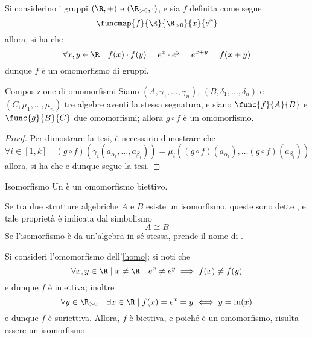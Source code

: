 \documentclass[a4paper, 12pt]{report}
\begin{document}
    \begin{example}[Omomorfismi]
        \label{homo}
        Si considerino i gruppi $(\R, +)$ e $(\R_{> 0}, \cdot)$, e sia $f$ definita come segue: $$\funcmap{f}{\R}{\R_{> 0}}{x}{e^x}$$ allora, si ha che $$\forall x, y \in \R \quad f(x) \cdot f(y) = e^x \cdot e^y = e^{x + y} = f(x + y)$$ dunque $f$ è un omomorfismo di gruppi.
    \end{example}

    \begin{framedprop}[label={comp homo}]{Composizione di omomorfismi}
        Siano $(A, \gamma_1, \ldots, \gamma_n)$, $(B, \delta_1, \ldots, \delta_n)$ e $(C, \mu_1, \ldots, \mu_n)$ tre algebre aventi la stessa segnatura, e siano $\func{f}{A}{B}$ e $\func{g}{B}{C}$ due omomorfismi; allora $g \circ f$ è un omomorfismo.
    \end{framedprop}

    \begin{proof}
        Per dimostrare la tesi, è necessario dimostrare che $$\forall i \in [1, k] \quad (g \circ f)(\gamma_i(a_{\alpha_i}, \ldots, a_{\beta_i})) = \mu_i((g \circ f)(a_{\alpha_i}), \ldots (g \circ f)(a_{\beta_i}))$$ allora, si ha che  e dunque segue la tesi.
    \end{proof}

    \begin{frameddefn}{Isomorfismo}
        Un  è un omomorfismo biettivo.

        Se tra due strutture algebriche $A$ e $B$ esiste un isomorfismo, queste sono dette , e tale proprietà è indicata dal simbolismo $$A \cong B$$ Se l'isomorfismo è da un'algebra in sé stessa, prende il nome di .
    \end{frameddefn}

    \begin{example}[Isomorfismi]
        Si consideri l'omomorfismo dell'\cref{homo}; si noti che $$\forall x, y \in \R \mid x \neq \R \quad e^x \neq e^y \implies f(x) \neq f(y)$$ e dunque $f$ è iniettiva; inoltre $$\forall y \in \R_{> 0} \quad \exists x \in \R \mid f(x) = e^x = y \iff y = \ln(x)$$ e dunque $f$ è suriettiva. Allora, $f$ è biettiva, e poiché è un omomorfismo, risulta essere un isomorfismo.
    \end{example}
\end{document}
